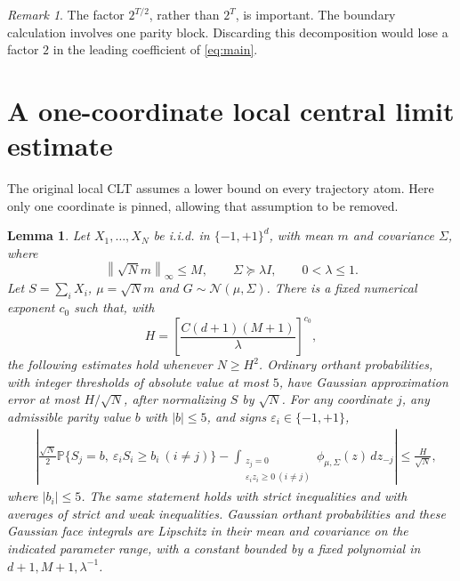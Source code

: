 \documentclass[11pt]{article}
\newtheorem{lemma}[theorem]{Lemma}
\theoremstyle{remark}\newtheorem{remark}[theorem]{Remark}
\newcommand{\Pp}{\mathbb P}
\newcommand{\cN}{\mathcal N}
\newcommand{\norm}[1]{\left\lVert #1\right\rVert}
\begin{document}
\begin{remark}
The factor $2^{T/2}$, rather than $2^T$, is important. The boundary
calculation involves one parity block. Discarding this decomposition
would lose a factor $2$ in the leading coefficient of \eqref{eq:main}.
\end{remark}

\section{A one-coordinate local central limit estimate}
The original local CLT assumes a lower bound on every trajectory atom.
Here only one coordinate is pinned, allowing that assumption to be
removed.

\begin{lemma}\label{lem:one-face-clt}
Let $X_1,\ldots,X_N$ be i.i.d. in $\{-1,+1\}^d$, with mean $m$ and
covariance $\Sigma$, where
\[
 \norm{\sqrt N m}_\infty\le M,\qquad \Sigma\succeq\lambda I,
 \qquad 0<\lambda\le1.
\]
Let $S=\sum_iX_i$, $\mu=\sqrt N m$ and $G\sim\cN(\mu,\Sigma)$.
There is a fixed numerical exponent $c_0$ such that, with
\[
 H=\left[\frac{C(d+1)(M+1)}\lambda\right]^{c_0},
\]
the following estimates hold whenever $N\ge H^2$.
Ordinary orthant probabilities, with integer thresholds of absolute value
at most $5$, have Gaussian approximation error at most $H/\sqrt N$,
after normalizing $S$ by $\sqrt N$.
For any coordinate $j$, any admissible parity value $b$ with $|b|\le5$,
and signs $\varepsilon_i\in\{-1,+1\}$,
\begin{align}
 &\left|\frac{\sqrt N}{2}\Pp\{S_j=b,
       \ \varepsilon_i S_i\ge b_i\ (i\ne j)\}
       -\int_{\substack{z_j=0\\\varepsilon_i z_i\ge0\ (i\ne j)}}
           \phi_{\mu,\Sigma}(z)\,dz_{-j}\right|
 \le\frac H{\sqrt N},\label{eq:face-clt}
\end{align}
where $|b_i|\le5$. The same statement holds with strict inequalities
and with averages of strict and weak inequalities.
Gaussian orthant probabilities and these Gaussian face integrals are
Lipschitz in their mean and covariance on the indicated parameter range,
with a constant bounded by a fixed polynomial in
$d+1,M+1,\lambda^{-1}$.
\end{lemma}
\end{document}
